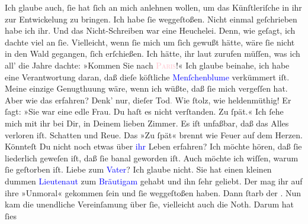            \pstart
           Ich glaube auch, ſie hat ſich an mich anlehnen wollen, um das Künſtleriſche in ihr
               zur Entwickelung zu bringen. Ich habe ſie weggeſtoßen. Nicht einmal geſchrieben habe
               ich ihr. Und das Nicht-Schreiben war eine Heuchelei. Denn, wie geſagt, ich dachte
               viel an ſie. Vielleicht, wenn ſie mich um ſich gewußt hätte, wäre ſie nicht in den
               Wald {\pb}gegangen, ſich erſchießen. Ich hätte, ihr laut
               zurufen müſſen, was ich all’ die Jahre dachte: »Kommen Sie nach \textsc{\textcolor{pink}{Paris}{}\ledrightnote{\textcolor{pink}{Paris}}}!« Ich glaube beinahe, ich habe
               eine Verantwortung daran, daß dieſe köſtliche \textcolor{blue}{Menſchenblume}{} verkümmert iſt. Meine einzige Genugthuung
               wäre, wenn ich wüßte, daß ſie mich vergeſſen hat. Aber wie das erfahren?\pend
           \pstart
           Denk’ nur, dieſer Tod\textcolor{gray}{.} Wie ſtolz, wie heldenmüthig! Er ſagt: »Sie
               war eine edle Frau. Du haſt es nicht verſtanden. Zu ſpät.«\pend
           \pstart
           Ich ſehe mich mit ihr bei Dir, in Deinem lieben {\pb}Zimmer. Es iſt unfaßbar, daß das Alles verloren iſt. Schatten und Reue. Das »Zu
               ſpät« brennt wie Feuer auf dem Herzen.\pend
           \pstart
           Könnteſt Du nicht noch etwas über \textcolor{blue}{ihr}{} Leben erfahren? Ich möchte hören, daß ſie liederlich geweſen iſt, daß
               ſie banal geworden iſt. Auch möchte ich wiſſen, \strikeout{\textcolor{gray}{×}} warum ſie geſtorben iſt.
               Liebe zum \textcolor{blue}{Vater}{}? Ich glaube
               nicht. Sie hat einen kleinen dummen \textcolor{blue}{Lieutenaut}{} zum \textcolor{blue}{Bräutigam}{} gehabt und ihn ſehr geliebt. Der mag ihr auf ihre »Unmoral«
               gekommen ſein und ſie weggeſtoßen {\pb}haben. Dann ſtarb
               der \label{K_L02628-2v}\label{K_L02628-2h}. Nun kam
               die unendliche Vereinſamung über ſie, vielleicht auch die Noth. Darum hat ſies
